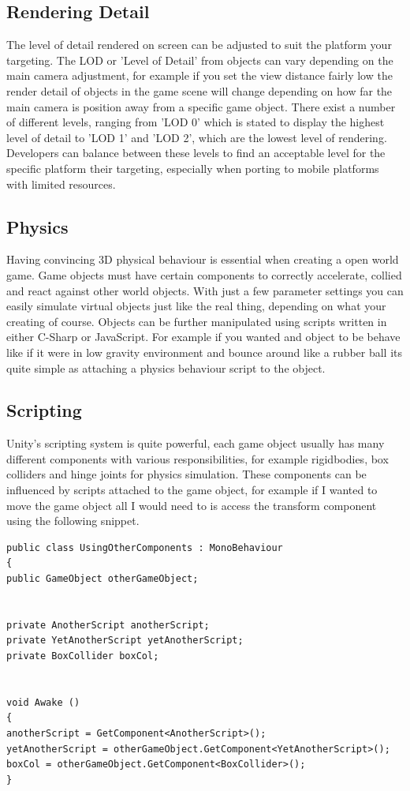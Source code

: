 \subsection{Rendering Detail}
The level of detail rendered on screen can be adjusted to suit the platform your targeting. The LOD or 'Level of Detail' from objects can vary depending on the main camera adjustment, for example if you set the view distance fairly low the render detail of objects in the game scene will change depending on how far the main camera is position away from a specific game object. There exist a number of different levels, ranging from 'LOD 0' which is stated to display the highest level of detail to 'LOD 1' and 'LOD 2', which are the lowest level of rendering. Developers can balance between these levels to find an acceptable level for the specific platform their targeting, especially when porting to mobile platforms with limited resources.

\subsection{Physics}
Having convincing 3D physical behaviour is essential when creating a open world game. Game objects must have certain components to correctly accelerate, collied and react against other world objects. With just a few parameter settings you can easily simulate virtual objects just like the real thing, depending on what your creating of course. Objects can be further manipulated using scripts written in either C-Sharp or JavaScript. For example if you wanted and object to be behave like if it were in low gravity environment and bounce around like a rubber ball its quite simple as attaching a physics behaviour script to the object. 

\subsection{Scripting}
Unity's scripting system is quite powerful, each game object usually has many different components with various responsibilities, for example rigidbodies, box colliders and hinge joints for physics simulation. These components can be influenced by scripts attached to the game object, for example if I wanted to move the game object all I would need to is access the transform component using the following snippet.

\begin{verbatim}
public class UsingOtherComponents : MonoBehaviour
{
public GameObject otherGameObject;


private AnotherScript anotherScript;
private YetAnotherScript yetAnotherScript;
private BoxCollider boxCol;


void Awake ()
{
anotherScript = GetComponent<AnotherScript>();
yetAnotherScript = otherGameObject.GetComponent<YetAnotherScript>();
boxCol = otherGameObject.GetComponent<BoxCollider>();
}
\end{verbatim}

